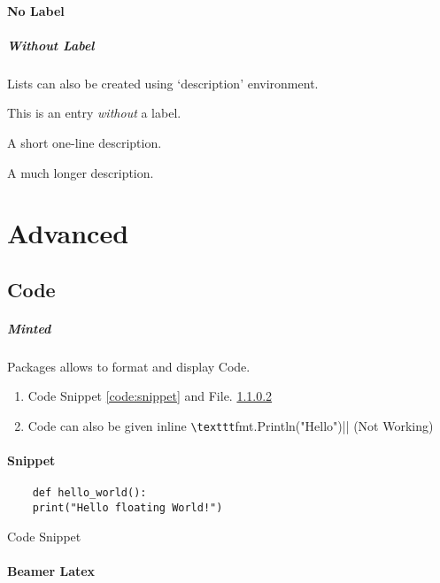 \documentclass{report}[a4paper,12pt] %
\begin{document}
\vspace{10pt}

\subsubsection{No Label}
\paragraph{Without Label} Lists can also be created using `description' environment.

\begin{description}
  \item This is an entry \textit{without} a label.
  \item[Something short] A short one-line description.
  \item[Something long] A much longer description. \lipsum[1]
\end{description}

\chapter{Advanced}
\section{Code}
\paragraph{Minted} Packages allows to format and display Code.

\begin{enumerate}
  \item Code Snippet \ref{code:snippet} and File. \ref{code:file}
  \item Code can also be given inline \verb|\texttt|fmt.Println("Hello")|| (Not Working)
\end{enumerate}

\subsubsection{Snippet}
\begin{listing}[h]
  \begin{verbatim}
    def hello_world():
    print("Hello floating World!")
  \end{verbatim}
  \caption{Code Snippet}
  \label{code:snippet}
\end{listing}

\subsubsection{Beamer Latex}
\label{code:file}
\end{document}

